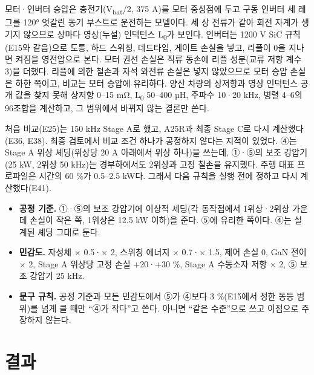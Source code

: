 모터·인버터 승압은 충전기(V\textsubscript{bat}/2, 375 A)를 모터 중성점에 두고 구동 인버터 세 레그를 120° 엇갈린 동기 부스트로 운전하는 모델이다. 세 상 전류가 같아 회전 자계가 생기지 않으므로 상마다 영상(누설) 인덕턴스 L\textsubscript{0}가 보인다. 인버터는 1200 V SiC 규칙(E15와 같음)으로 도통, 하드 스위칭, 데드타임, 게이트 손실을 넣고, 리플이 0을 지나면 켜짐을 영전압으로 본다. 모터 권선 손실은 직류 동손에 리플 성분(교류 저항 계수 3)을 더했다. 리플에 의한 철손과 자석 와전류 손실은 넣지 않았으므로 모터 승압 손실은 하한 쪽이고, 비교는 모터 승압에 유리하다. 양산 차량의 상저항과 영상 인덕턴스 공개 값을 찾지 못해 상저항 0–15 mΩ, L\textsubscript{0} 50–400 µH, 주파수 10·20 kHz, 병렬 4–6의 96조합을 계산하고, 그 범위에서 바뀌지 않는 결론만 쓴다.

처음 비교(E25)는 150 kHz Stage A로 했고, A25R과 최종 Stage C로 다시 계산했다(E36, E38). 최종 검토에서 비교 조건 하나가 공정하지 않다는 지적이 있었다. ④는 Stage A 위상 셰딩(위상당 20 A 아래에서 위상 하나)을 쓰는데, ①·⑤의 보조 강압기(25 kW, 2위상 50 kHz)는 경부하에서도 2위상과 고정 철손을 유지했다. 주행 대표 프로파일은 시간의 60 \%가 0.5–2.5 kW다. 그래서 다음 규칙을 실행 전에 정하고 다시 계산했다(E41).

\begin{itemize}
\item \textbf{공정 기준.} ①·⑤의 보조 강압기에 이상적 셰딩(각 동작점에서 1위상·2위상 가운데 손실이 작은 쪽, 1위상은 12.5 kW 이하)을 준다. ⑤에 유리한 쪽이다. ④는 설계된 셰딩 그대로 둔다.
\item \textbf{민감도.} 자성체 × 0.5·× 2, 스위칭 에너지 × 0.7·× 1.5, 제어 손실 0, GaN 전이 × 2, Stage A 위상당 고정 손실 +20·+30 \%, Stage A 수동소자 저항 × 2, ⑤ 보조 강압기 25 kHz.
\item \textbf{문구 규칙.} 공정 기준과 모든 민감도에서 ⑤가 ④보다 3 \%(E15에서 정한 동등 범위)를 넘게 클 때만 “④가 작다”고 쓴다. 아니면 “같은 수준”으로 쓰고 이점으로 주장하지 않는다.
\end{itemize}

\section{결과}

